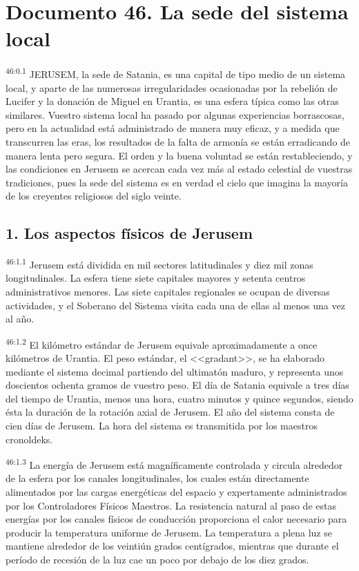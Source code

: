 \chapter{Documento 46. La sede del sistema local}
\par
\textsuperscript{46:0.1} JERUSEM, la sede de Satania, es una capital de tipo medio de un sistema local, y aparte de las numerosas irregularidades ocasionadas por la rebelión de Lucifer y la donación de Miguel en Urantia, es una esfera típica como las otras similares. Vuestro sistema local ha pasado por algunas experiencias borrascosas, pero en la actualidad está administrado de manera muy eficaz, y a medida que transcurren las eras, los resultados de la falta de armonía se están erradicando de manera lenta pero segura. El orden y la buena voluntad se están restableciendo, y las condiciones en Jerusem se acercan cada vez más al estado celestial de vuestras tradiciones, pues la sede del sistema es en verdad el cielo que imagina la mayoría de los creyentes religiosos del siglo veinte.

\section*{1. Los aspectos físicos de Jerusem}
\par
\textsuperscript{46:1.1} Jerusem está dividida en mil sectores latitudinales y diez mil zonas longitudinales. La esfera tiene siete capitales mayores y setenta centros administrativos menores. Las siete capitales regionales se ocupan de diversas actividades, y el Soberano del Sistema visita cada una de ellas al menos una vez al año.

\par
\textsuperscript{46:1.2} El kilómetro estándar de Jerusem equivale aproximadamente a once kilómetros de Urantia. El peso estándar, el <<gradant>>, se ha elaborado mediante el sistema decimal partiendo del ultimatón maduro, y representa unos doscientos ochenta gramos de vuestro peso. El día de Satania equivale a tres días del tiempo de Urantia, menos una hora, cuatro minutos y quince segundos, siendo ésta la duración de la rotación axial de Jerusem. El año del sistema consta de cien días de Jerusem. La hora del sistema es transmitida por los maestros cronoldeks.

\par
\textsuperscript{46:1.3} La energía de Jerusem está magníficamente controlada y circula alrededor de la esfera por los canales longitudinales, los cuales están directamente alimentados por las cargas energéticas del espacio y expertamente administrados por los Controladores Físicos Maestros. La resistencia natural al paso de estas energías por los canales físicos de conducción proporciona el calor necesario para producir la temperatura uniforme de Jerusem. La temperatura a plena luz se mantiene alrededor de los veintiún grados centígrados, mientras que durante el período de recesión de la luz cae un poco por debajo de los diez grados.

